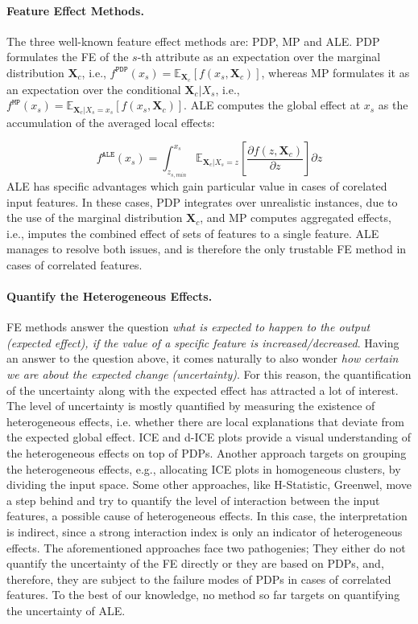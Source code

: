 \documentclass[twoside]{article}
\newcommand{\Xcb}{\mathbf{X}_c}
\begin{document}
\paragraph{Feature Effect Methods.} The three well-known feature
effect methods are: PDP, MP and ALE. PDP formulates the FE
of the \(s\)-th attribute as an expectation over the marginal
distribution \(\mathbf{X}_c\), i.e.,
\(f^{\mathtt{PDP}}(x_s) =
\mathbb{E}_{\mathbf{X}_c}[f(x_s,\mathbf{X}_c)]\), whereas MP
formulates it as an expectation over the conditional
\(\mathbf{X}_c|X_s\), i.e.,
\(f^{\mathtt{MP}}(x_s) = \mathbb{E}_{\mathbf{X}_c|X_s = x_s}[f(x_s,
\mathbf{X}_c)]\). ALE computes the global effect at \(x_s\) as the
accumulation of the averaged local effects:

\begin{equation}
  \label{eq:ALE_accumulated_mean}
  f^{\mathtt{ALE}}(x_s) = \int_{z_{s,min}}^{x_s} \mathbb{E}_{\Xcb|X_s=z}\left[\frac{\partial f(z, \Xcb)}{\partial z}\right] \partial z
\end{equation}
%
ALE has specific advantages which gain particular value in cases of
corelated input features. In these cases, PDP integrates over
unrealistic instances, due to the use of the marginal distribution
\(\mathbf{X}_c \), and MP computes aggregated effects, i.e., imputes
the combined effect of sets of features to a single feature. ALE
manages to resolve both issues, and is therefore the only trustable
FE method in cases of correlated features.

\paragraph{Quantify the Heterogeneous Effects.}

FE methods answer the question \textit{what is expected to happen to
  the output (expected effect), if the value of a specific feature is
  increased/decreased}. Having an answer to the question above, it
comes naturally to also wonder \textit{how certain we are about the
  expected change (uncertainty)}. For this reason, the quantification
of the uncertainty along with the expected effect has attracted a lot
of interest. The level of uncertainty is mostly quantified by
measuring the existence of heterogeneous effects, i.e. whether there
are local explanations that deviate from the expected global
effect. ICE and d-ICE plots provide a visual understanding of the
heterogeneous effects on top of PDPs. Another approach targets on
grouping the heterogeneous effects, e.g., allocating ICE plots in
homogeneous clusters, by dividing the input
space.\citep{molnar2020model} Some other approaches, like H-Statistic,
Greenwel, move a step behind and try to quantify the level of
interaction between the input features, a possible cause of
heterogeneous effects. In this case, the interpretation is indirect,
since a strong interaction index is only an indicator of heterogeneous
effects. The aforementioned approaches face two pathogenies; They
either do not quantify the uncertainty of the FE directly or they are
based on PDPs, and, therefore, they are subject to the failure modes
of PDPs in cases of correlated features. To the best of our knowledge,
no method so far targets on quantifying the uncertainty of ALE.
\end{document}
